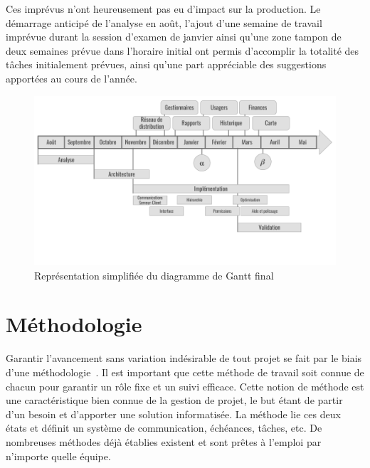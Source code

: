 \documentclass{EPL-master-thesis-covers-FR}
\begin{document}
				Ces imprévus n'ont heureusement pas eu d'impact sur la production. Le démarrage anticipé de l'analyse en août, l'ajout d'une semaine de travail imprévue durant la session d'examen de janvier ainsi qu'une zone tampon de deux semaines prévue dans l'horaire initial ont permis d'accomplir la totalité des tâches initialement prévues, ainsi qu'une part appréciable des suggestions apportées au cours de l'année.

				\begin{figure}
					\includegraphics[width=\textwidth]{images/planning_timeline.png}
					\caption{Représentation simplifiée du diagramme de Gantt final}
					\label{fig:simplified_gantt}
				\end{figure}


		\section{Méthodologie}

			Garantir l'avancement sans variation indésirable de tout projet se fait par le biais d'une méthodologie~\cite{ref:kolp_methodologies}. Il est important que cette méthode de travail soit connue de chacun pour garantir un rôle fixe et un suivi efficace. Cette notion de méthode est une caractéristique bien connue de la gestion de projet, le but étant de partir d'un besoin et d'apporter une solution informatisée. La méthode lie ces deux états et définit un système de communication, échéances, tâches, etc. De nombreuses méthodes déjà établies existent et sont prêtes à l'emploi par n'importe quelle équipe.
\end{document}
